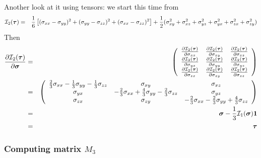Another look at it using tensors: we start this time from 
\begin{eqnarray}
{\cal I}_2({\bm \tau})   
&=&
\frac{1}{6}\left[(\sigma_{xx}-\sigma_{yy})^2 + (\sigma_{yy}-\sigma_{zz})^2 + (\sigma_{xx}-\sigma_{zz})^2 \right]  
+\frac12( \sigma_{xy}^2 + \sigma_{xz}^2 + \sigma_{yz}^2  
+ \sigma_{yx}^2 + \sigma_{zx}^2 + \sigma_{zy}^2) 
\end{eqnarray}
Then
\begin{eqnarray}
\frac{\partial {\cal I}_2(\bm\tau)}{\partial \bm\sigma}  
&=&
\left(
\begin{array}{ccc}
\frac{\partial {\cal I}_2(\bm\tau)}{\partial \sigma_{xx}} &   
\frac{\partial {\cal I}_2(\bm\tau)}{\partial \sigma_{xy}} &   
\frac{\partial {\cal I}_2(\bm\tau)}{\partial \sigma_{xz}} \\
\frac{\partial {\cal I}_2(\bm\tau)}{\partial \sigma_{yx}} &   
\frac{\partial {\cal I}_2(\bm\tau)}{\partial \sigma_{yy}} &   
\frac{\partial {\cal I}_2(\bm\tau)}{\partial \sigma_{yz}} \\
\frac{\partial {\cal I}_2(\bm\tau)}{\partial \sigma_{zx}} &   
\frac{\partial {\cal I}_2(\bm\tau)}{\partial \sigma_{zy}} &   
\frac{\partial {\cal I}_2(\bm\tau)}{\partial \sigma_{zz}} 
\end{array}
\right) \nonumber\\
&=&
\left(
\begin{array}{ccc}
\frac23 \sigma_{xx} -\frac13\sigma_{yy} -\frac13\sigma_{zz} & \sigma_{xy}& \sigma_{xz} \\
\sigma_{yx}&-\frac23 \sigma_{xx} +\frac43\sigma_{yy} -\frac23\sigma_{zz} & \sigma_{yz}\\
\sigma_{zx}& \sigma_{zy}& -\frac23\sigma_{xx} -\frac23\sigma_{yy} +\frac43\sigma_{zz} 
\end{array}
\right) \nonumber\\
&=&{\bm\sigma} - \frac13 {\cal I}_1(\bm\sigma)\bm 1 \nonumber\\
&=& \bm \tau \label{eq:dI2dtau}
\end{eqnarray}









\subsubsection{Computing matrix $M_3$}

